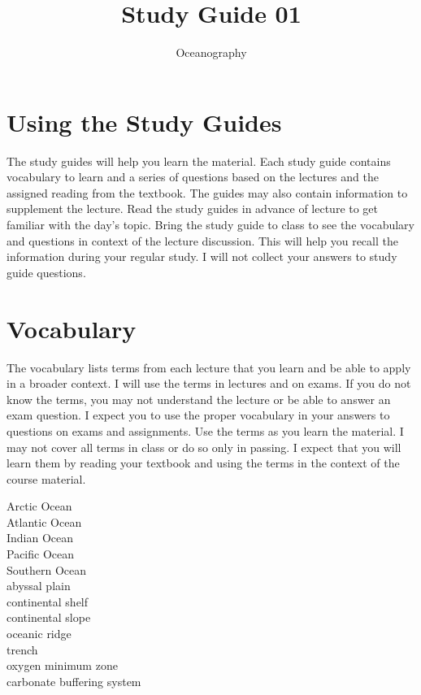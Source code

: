\documentclass[nofonts, letterpaper]{tufte-handout}
\title{Study Guide 01}
\author{Oceanography}
\date{} %
\begin{document}
\maketitle	%


\section{Using the Study Guides}
The study guides will help you learn the material.  Each study guide contains vocabulary to learn and a series of questions based on the lectures and the assigned reading from the textbook.  The guides may also contain information to supplement the lecture.  Read the study guides in advance of lecture to get familiar with the day's topic. Bring the study guide to class to see the vocabulary and questions in context of the lecture discussion.  This will help you recall the information during your regular study. I will not collect your answers to study guide questions.

\section{Vocabulary}
The vocabulary lists terms from each lecture that you learn and be able to apply in a broader context.  I will use the terms in lectures and on exams. If you do not know the terms, you may not understand the lecture or be able to answer an exam question. I expect you to use the proper vocabulary in your answers to questions on exams and assignments.  Use the terms as you learn the material.  I may not cover all terms in class or do so only in passing.  I expect that you will learn them by reading your textbook and using the terms in the context of the course material.

\begin{multicols}{2}
Arctic Ocean \\
Atlantic Ocean \\
Indian Ocean \\
Pacific Ocean \\
Southern Ocean \\
abyssal plain \\
continental shelf \\
continental slope \\
oceanic ridge \\
trench \\
oxygen minimum zone \\
carbonate buffering system
\end{multicols}
\end{document}
